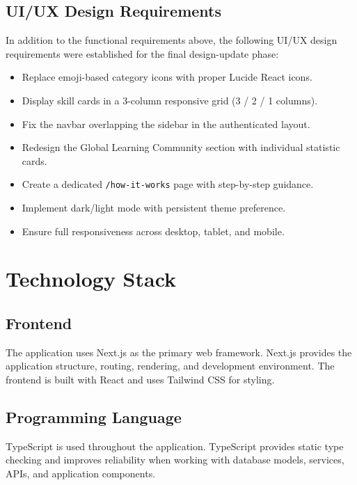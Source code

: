 \documentclass[12pt,a4paper]{report}
\begin{document}
\section{UI/UX Design Requirements}
In addition to the functional requirements above, the following UI/UX design
requirements were established for the final design-update phase:

\begin{itemize}[noitemsep]
  \item Replace emoji-based category icons with proper Lucide React icons.
  \item Display skill cards in a 3-column responsive grid (3 / 2 / 1 columns).
  \item Fix the navbar overlapping the sidebar in the authenticated layout.
  \item Redesign the Global Learning Community section with individual statistic
        cards.
  \item Create a dedicated \texttt{/how-it-works} page with step-by-step
        guidance.
  \item Implement dark/light mode with persistent theme preference.
  \item Ensure full responsiveness across desktop, tablet, and mobile.
\end{itemize}

\chapter{Technology Stack}

\section{Frontend}
The application uses Next.js as the primary web framework.  Next.js provides
the application structure, routing, rendering, and development environment.  The
frontend is built with React and uses Tailwind CSS for styling.

\section{Programming Language}
TypeScript is used throughout the application.  TypeScript provides static type
checking and improves reliability when working with database models, services,
APIs, and application components.
\end{document}
